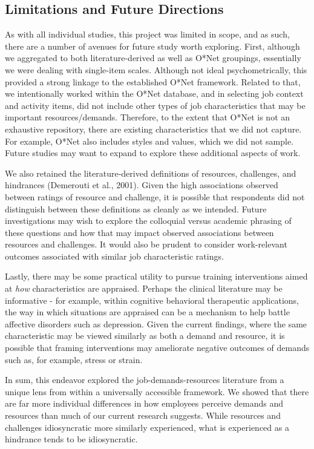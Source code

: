 \documentclass[
  man,mask]{apa6}
\begin{document}
\hypertarget{limitations-and-future-directions}{%
\subsection{Limitations and Future Directions}\label{limitations-and-future-directions}}

As with all individual studies, this project was limited in scope, and as such, there are a number of avenues for future study worth exploring. First, although we aggregated to both literature-derived as well as O*Net groupings, essentially we were dealing with single-item scales. Although not ideal psychometrically, this provided a strong linkage to the established O*Net framework. Related to that, we intentionally worked within the O*Net database, and in selecting job context and activity items, did not include other types of job characteristics that may be important resources/demands. Therefore, to the extent that O*Net is not an exhaustive repository, there are existing characteristics that we did not capture. For example, O*Net also includes styles and values, which we did not sample. Future studies may want to expand to explore these additional aspects of work.

We also retained the literature-derived definitions of resources, challenges, and hindrances (Demerouti et al., 2001). Given the high associations observed between ratings of resource and challenge, it is possible that respondents did not distinguish between these definitions as cleanly as we intended. Future investigations may wish to explore the colloquial versus academic phrasing of these questions and how that may impact observed associations between resources and challenges. It would also be prudent to consider work-relevant outcomes associated with similar job characteristic ratings.

Lastly, there may be some practical utility to pursue training interventions aimed at \emph{how} characteristics are appraised. Perhaps the clinical literature may be informative - for example, within cognitive behavioral therapeutic applications, the way in which situations are appraised can be a mechanism to help battle affective disorders such as depression. Given the current findings, where the same characteristic may be viewed similarly as both a demand and resource, it is possible that framing interventions may ameliorate negative outcomes of demands such as, for example, stress or strain.

In sum, this endeavor explored the job-demands-resources literature from a unique lens from within a universally accessible framework. We showed that there are far more individual differences in how employees perceive demands and resources than much of our current research suggests. While resources and challenges idiosyncratic more similarly experienced, what is experienced as a hindrance tends to be idiosyncratic.
\end{document}
